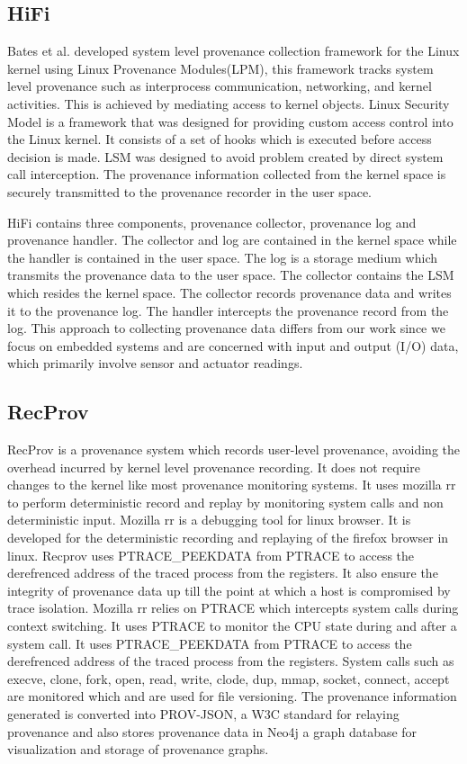 \subsection{HiFi}
Bates et al. \cite{hi_fi}  developed system level provenance collection framework for the Linux kernel using Linux Provenance Modules(LPM), this framework tracks system level provenance such as interprocess communication, networking, and kernel activities. This is achieved by mediating access to kernel objects. Linux Security Model is a framework that was designed for providing custom access control into the Linux kernel. It consists of a set of hooks which is executed before access decision is made. LSM was designed to avoid problem created by direct system call interception. The provenance information collected from the kernel space is securely transmitted to the provenance recorder in the user space. 
\par HiFi contains three components, provenance collector, provenance log and provenance handler. The collector and log are contained in the kernel space while the handler is contained in the user space. The log is a storage medium which transmits the provenance data to the user space. The collector contains the LSM which resides the kernel space. The collector records provenance data and writes it to the provenance log. The handler intercepts the provenance record from the log. This approach to collecting provenance data differs from our work since we focus on embedded systems and are concerned with input and output (I/O) data, which primarily involve sensor and actuator readings.

\subsection{RecProv}

RecProv \cite{rec_prov} is a provenance system which records user-level provenance, avoiding the overhead incurred by kernel level provenance recording. It does not require changes to the kernel like most provenance monitoring systems. It uses mozilla rr to perform deterministic record and replay by monitoring system calls  and non deterministic input. Mozilla rr is a debugging tool for linux browser. It is developed for the deterministic recording and replaying of the firefox browser in linux. Recprov uses PTRACE\_PEEKDATA from PTRACE to access the derefrenced address of the traced process from the registers. It also ensure the integrity of provenance data up till the point at which a host is compromised by trace isolation. Mozilla rr relies on PTRACE which intercepts system calls during context switching. It uses PTRACE to monitor the CPU state during and after a system call. It uses PTRACE\_PEEKDATA from PTRACE to access the derefrenced address of the traced process from the registers. System calls such as execve, clone, fork, open, read, write, clode, dup, mmap, socket, connect, accept are monitored which and are used for file versioning. The provenance information generated is converted into PROV-JSON, a W3C standard for relaying provenance and also stores provenance data in Neo4j a graph database for visualization and storage of provenance graphs. 

